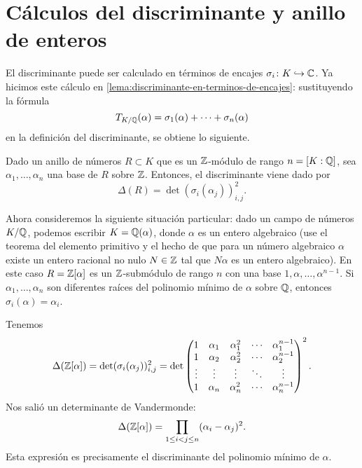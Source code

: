 
\section{Cálculos del discriminante y anillo de enteros}

El discriminante puede ser calculado en términos de encajes
$\sigma_i\colon K \hookrightarrow \mathbb{C}$. Ya hicimos este cálculo en
\ref{lema:discriminante-en-terminos-de-encajes}: sustituyendo la fórmula
$$T_{K/\mathbb{Q}} (\alpha) = \sigma_1 (\alpha) + \cdots + \sigma_n (\alpha)$$
en la definición del discriminante, se obtiene lo siguiente.

\begin{proposicion}
  Dado un anillo de números $R \subset K$ que es un $\mathbb{Z}$-módulo de rango
  $n = [K : \mathbb{Q}]$, sea $\alpha_1, \ldots, \alpha_n$ una base de $R$ sobre
  $\mathbb{Z}$. Entonces, el discriminante viene dado por
  $$\Delta (R) = \det (\sigma_i (\alpha_j))_{i,j}^2.$$
\end{proposicion}

Ahora consideremos la siguiente situación particular: dado un campo de números
$K/\mathbb{Q}$, podemos escribir $K = \mathbb{Q} (\alpha)$, donde $\alpha$ es un entero
algebraico (use el teorema del elemento primitivo y el hecho de que para un
número algebraico $\alpha$ existe un entero racional no nulo $N \in \mathbb{Z}$ tal que
$N\alpha$ es un entero algebraico). En este caso $R = \mathbb{Z} [\alpha]$ es un
$\mathbb{Z}$-submódulo de rango $n$ con una base $1, \alpha, \ldots, \alpha^{n-1}$.
Si $\alpha_1, \ldots, \alpha_n$ son diferentes raíces del polinomio mínimo
de $\alpha$ sobre $\mathbb{Q}$, entonces $\sigma_i (\alpha) = \alpha_i$.

Tenemos
\[ \Delta (\mathbb{Z} [\alpha]) = \det (\sigma_i (\alpha_j))_{i,j}^2 =
   \det \begin{pmatrix}
     1 & \alpha_1 & \alpha_1^2 & \cdots & \alpha_1^{n-1} \\
     1 & \alpha_2 & \alpha_2^2 & \cdots & \alpha_2^{n-1} \\
     \vdots & \vdots & \vdots & \ddots & \vdots \\
     1 & \alpha_n & \alpha_n^2 & \cdots & \alpha_n^{n-1} \\
   \end{pmatrix}^2. \]
Nos salió un determinante de Vandermonde:
$$\Delta (\mathbb{Z} [\alpha]) = \prod_{1 \le i < j \le n} (\alpha_i - \alpha_j)^2.$$
Esta expresión es precisamente el discriminante del polinomio mínimo de
$\alpha$.

